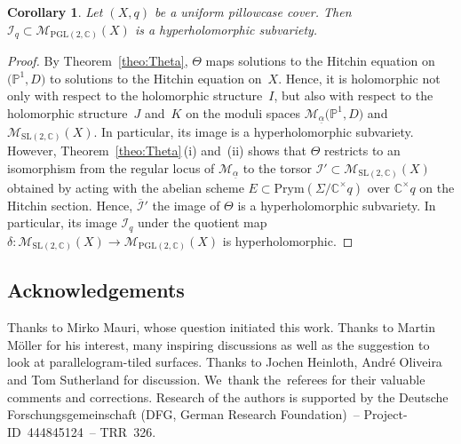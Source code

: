 \documentclass[pdftex]{sigma}
\numberwithin{equation}{section}
\newtheorem{coro}[theo]{Corollary}
\theoremstyle{definition}
\renewcommand{\to}{\rightarrow}
\newcommand{\ualpha}{\underline{\alpha}}
\newcommand{\calI}{\mathcal{I}}
\newcommand{\calM}{\mathcal{M}}
\newcommand{\CC}{\mathbb{C}}
\newcommand{\PP}{\mathbb{P}}
\newcommand{\Prym}{\mathrm{Prym}}
\newcommand{\SL}{\mathrm{SL}}
\newcommand{\PGL}{\mathrm{PGL}}
\begin{document}
\begin{coro}\label{coro:hyperholomorphic} Let $(X,q)$ be a uniform pillowcase cover. Then $\calI_q \subset \calM_{\PGL(2,\CC)}(X)$ is a hyperholomorphic subvariety.
\end{coro}
\begin{proof} By Theorem~\ref{theo:Theta}, $\Theta$ maps solutions to the Hitchin equation on $\bigl(\PP^1,D\bigr)$ to solutions to the Hitchin equation on~$X$. Hence, it is holomorphic not only with respect to the holomorphic structure~$I$, but also with respect to the holomorphic structure~$J$ and~$K$ on the moduli spaces $\calM_{\ualpha}\bigl(\PP^1,D\bigr)$ and $\calM_{\SL(2,\CC)}(X)$. In particular, its image is a hyperholomorphic subvariety. However, Theorem~\ref{theo:Theta}\,(i) and~(ii) shows that $\Theta$ restricts to an isomorphism from the regular locus of $\calM_{\ualpha}$ to the torsor $\calI' \subset \calM_{\SL(2,\CC)}(X)$ obtained by acting with the abelian scheme $E \subset \Prym(\Sigma/\CC^\times q )$ over $\CC^\times q$ on the Hitchin section. Hence, $\overline{\calI}'$ the image of $\Theta$ is a hyperholomorphic subvariety. In particular, its image $\calI_q$ under the quotient map $\delta\colon \calM_{\SL(2,\CC)}(X) \to \calM_{\PGL(2,\CC)}(X)$ is hyperholomorphic.
\end{proof}

\subsection*{Acknowledgements} Thanks to Mirko Mauri, whose question initiated this work. Thanks to Martin M\"oller for his interest, many inspiring discussions as well as the suggestion to look at parallelogram-tiled surfaces. Thanks to Jochen Heinloth, Andr\'e Oliveira and Tom Sutherland for discussion. We~thank the~referees for their valuable comments and corrections. Research of the authors is supported by the Deutsche Forschungsgemeinschaft (DFG, German Research Foundation)~-- Project-ID~444845124~-- TRR~326.
\end{document}
